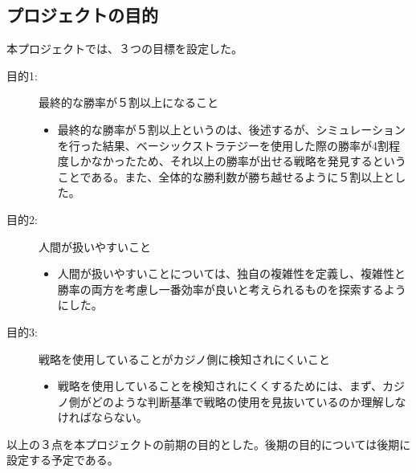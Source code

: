 \subsection{プロジェクトの目的}
本プロジェクトでは、３つの目標を設定した。
\begin{description}
\item[目的1:]最終的な勝率が５割以上になること
\begin{itemize}
\item{最終的な勝率が５割以上というのは、後述するが、シミュレーションを行った結果、ベーシックストラテジーを使用した際の勝率が4割程度しかなかったため、それ以上の勝率が出せる戦略を発見するということである。また、全体的な勝利数が勝ち越せるように５割以上とした。}
\end{itemize}
\item[目的2:]人間が扱いやすいこと
\begin{itemize}
\item{人間が扱いやすいことについては、独自の複雑性を定義し、複雑性と勝率の両方を考慮し一番効率が良いと考えられるものを探索するようにした。}
\end{itemize}
\item[目的3:]戦略を使用していることがカジノ側に検知されにくいこと
\begin{itemize}
\item{戦略を使用していることを検知されにくくするためには、まず、カジノ側がどのような判断基準で戦略の使用を見抜いているのか理解しなければならない。}
\end{itemize}
\end{description}
以上の３点を本プロジェクトの前期の目的とした。後期の目的については後期に設定する予定である。
